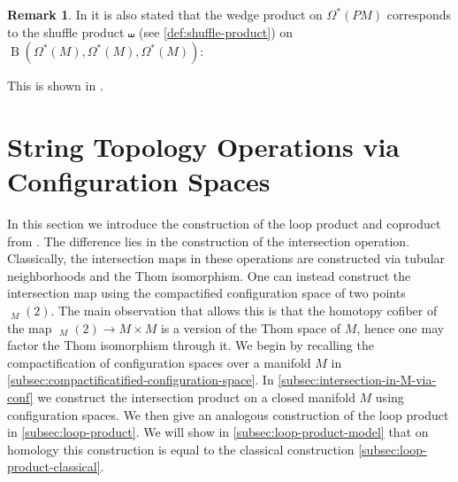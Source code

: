 \documentclass{scrartcl}
\theoremstyle{plain}
\theoremstyle{definition}
\newtheorem{remark}[theorem]{Remark}
\DeclareMathOperator{\BC}{B}
\DeclareMathOperator{\cConf}{\overline{Conf}}
\begin{document}
\begin{remark}
    In \cite{naef2019string} it is also stated that the wedge product on $\Omega^*(PM)$ corresponds to the shuffle product $\shuffle$ (see \cref{def:shuffle-product}) on $\BC(\Omega^*(M), \Omega^*(M), \Omega^*(M))$:
    \begin{center}
    \end{center}
    This is shown in \cite[4.1]{chen1973iterated}.

\end{remark}





\section{String Topology Operations via Configuration Spaces}

In this section we introduce the construction of the loop product and coproduct from \cite{naef2019string}. The difference lies in the construction of the intersection operation. Classically, the intersection maps in these operations are constructed via tubular neighborhoods and the Thom isomorphism. One can instead construct the intersection map using the compactified configuration space of two points $\cConf_M(2)$. The main observation that allows this is that the homotopy cofiber of the map $\cConf_M(2)\to M\times M$ is a version of the Thom space of $M$, hence one may factor the Thom isomorphism through it. We begin by recalling the compactification of configuration spaces over a manifold $M$ in \cref{subsec:compactificatified-configuration-space}. In \cref{subsec:intersection-in-M-via-conf} we construct the intersection product on a closed manifold $M$ using configuration spaces. We then give an analogous construction of the loop product in \cref{subsec:loop-product}. We will show in \ref{subsec:loop-product-model} that on homology this construction is equal to the classical construction \ref{subsec:loop-product-classical}. 
\end{document}
